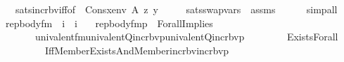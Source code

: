 \begin{isabellebody}
\isanewline
\ \ \ \ sats{\isacharunderscore}{\kern0pt}incr{\isacharunderscore}{\kern0pt}bv{}{\isacharunderscore}{\kern0pt}iff{\isacharbrackleft}{\kern0pt}of\ {\isacharunderscore}{\kern0pt}\ {\isachardoublequoteopen}Cons{\isacharparenleft}{\kern0pt}x{\isacharcomma}{\kern0pt}env{\isacharparenright}{\kern0pt}{\isachardoublequoteclose}\ A\ z\ y{\isacharbrackright}{\kern0pt}\ \isanewline
\ \ \ \ sats{\isacharunderscore}{\kern0pt}swap{\isacharunderscore}{\kern0pt}vars\ \ assms\ \isanewline
\ \ \ \isamarkupfalse%
\ simp{\isacharunderscore}{\kern0pt}all%
\endisatagproof
{\isafoldproof}%
%
\isadelimproof
\isanewline
%
\endisadelimproof
\isanewline
{}\isamarkupfalse%
\isanewline
\ \ rep{\isacharunderscore}{\kern0pt}body{\isacharunderscore}{\kern0pt}fm\ {\isacharcolon}{\kern0pt}{\isacharcolon}{\kern0pt}\ {\isachardoublequoteopen}i\ {\isasymRightarrow}\ i{\isachardoublequoteclose}\ \isanewline
\ \ {\isachardoublequoteopen}rep{\isacharunderscore}{\kern0pt}body{\isacharunderscore}{\kern0pt}fm{\isacharparenleft}{\kern0pt}p{\isacharparenright}{\kern0pt}\ {\isasymequiv}\ Forall{\isacharparenleft}{\kern0pt}Implies{\isacharparenleft}{\kern0pt}\isanewline
\ \ \ \ \ \ \ \ univalent{\isacharunderscore}{\kern0pt}fm{\isacharparenleft}{\kern0pt}univalent{\isacharunderscore}{\kern0pt}Q{}{\isacharparenleft}{\kern0pt}incr{\isacharunderscore}{\kern0pt}bv{\isacharparenleft}{\kern0pt}p{\isacharparenright}{\kern0pt}{\isacharbackquote}{\kern0pt}{}{\isacharparenright}{\kern0pt}{\isacharcomma}{\kern0pt}univalent{\isacharunderscore}{\kern0pt}Q{}{\isacharparenleft}{\kern0pt}incr{\isacharunderscore}{\kern0pt}bv{\isacharparenleft}{\kern0pt}p{\isacharparenright}{\kern0pt}{\isacharbackquote}{\kern0pt}{}{\isacharparenright}{\kern0pt}{\isacharcomma}{\kern0pt}{}{\isacharparenright}{\kern0pt}{\isacharcomma}{\kern0pt}\isanewline
\ \ \ \ \ \ \ \ Exists{\isacharparenleft}{\kern0pt}Forall{\isacharparenleft}{\kern0pt}\isanewline
\ \ \ \ \ \ \ \ \ \ Iff{\isacharparenleft}{\kern0pt}Member{\isacharparenleft}{\kern0pt}{}{\isacharcomma}{\kern0pt}{}{\isacharparenright}{\kern0pt}{\isacharcomma}{\kern0pt}Exists{\isacharparenleft}{\kern0pt}And{\isacharparenleft}{\kern0pt}Member{\isacharparenleft}{\kern0pt}{}{\isacharcomma}{\kern0pt}{}{\isacharparenright}{\kern0pt}{\isacharcomma}{\kern0pt}incr{\isacharunderscore}{\kern0pt}bv{\isacharparenleft}{\kern0pt}incr{\isacharunderscore}{\kern0pt}bv{\isacharparenleft}{\kern0pt}p{\isacharparenright}{\kern0pt}{\isacharbackquote}{\kern0pt}{}{\isacharparenright}{\kern0pt}{\isacharbackquote}{\kern0pt}{}{\isacharparenright}{\kern0pt}{\isacharparenright}{\kern0pt}{\isacharparenright}{\kern0pt}{\isacharparenright}{\kern0pt}{\isacharparenright}{\kern0pt}{\isacharparenright}{\kern0pt}{\isacharparenright}{\kern0pt}{\isachardoublequoteclose}\isanewline

\end{isabellebody}

